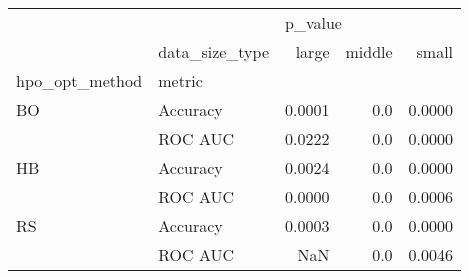 \begin{tabular}{llrrr}
\toprule
   & {} & \multicolumn{3}{l}{p\_value} \\
   & data\_size\_type &   large & middle &   small \\
hpo\_opt\_method & metric &         &        &         \\
\midrule
BO & Accuracy &  0.0001 &    0.0 &  0.0000 \\
   & ROC AUC &  0.0222 &    0.0 &  0.0000 \\
HB & Accuracy &  0.0024 &    0.0 &  0.0000 \\
   & ROC AUC &  0.0000 &    0.0 &  0.0006 \\
RS & Accuracy &  0.0003 &    0.0 &  0.0000 \\
   & ROC AUC &     NaN &    0.0 &  0.0046 \\
\bottomrule
\end{tabular}
